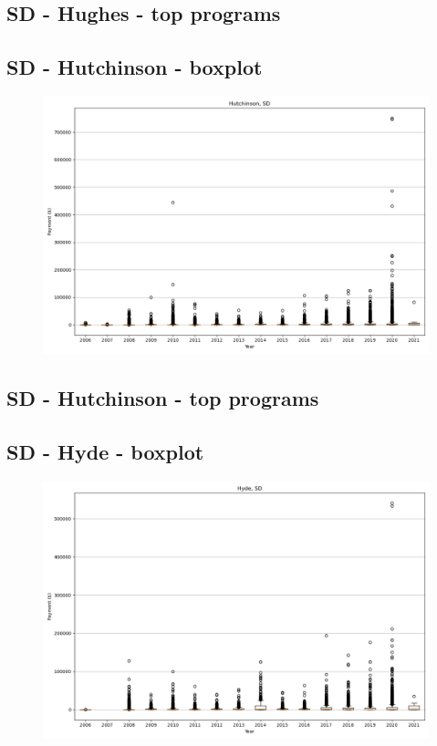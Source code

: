 \subsection*{SD - Hughes - top programs}

\newpage
\subsection*{SD - Hutchinson - boxplot}
\begin{figure}[h]
\centering
\includegraphics[width=7in]{../output/boxplots/counties/Hutchinson-SD_boxplot.png}
\end{figure}


\subsection*{SD - Hutchinson - top programs}

\newpage
\subsection*{SD - Hyde - boxplot}
\begin{figure}[h]
\centering
\includegraphics[width=7in]{../output/boxplots/counties/Hyde-SD_boxplot.png}
\end{figure}



